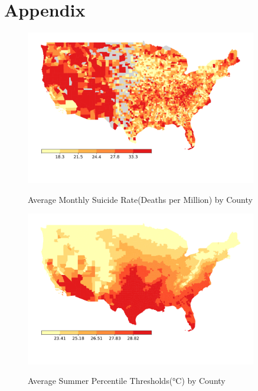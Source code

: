 \documentclass[12pt, a4paper]{article}
\begin{document}
\section{Appendix}
\appendix
\renewcommand{\thefigure}{A.\arabic{figure}}
\setcounter{figure}{0}

\begin{figure}[H]
    \centering
    \caption{Average Monthly Suicide Rate(Deaths per Million) by County}
    \includegraphics[width=0.9\textwidth]{suicide map.png}
    \label{fig:suicide_map}
\end{figure}


\begin{figure}[H]
    \centering
    \caption{Average Summer Percentile Thresholds(°C) by County}
    \includegraphics[width=0.9\textwidth]{thresholds.png}
    \label{fig:thresholds_map}
\end{figure}
\end{document}
